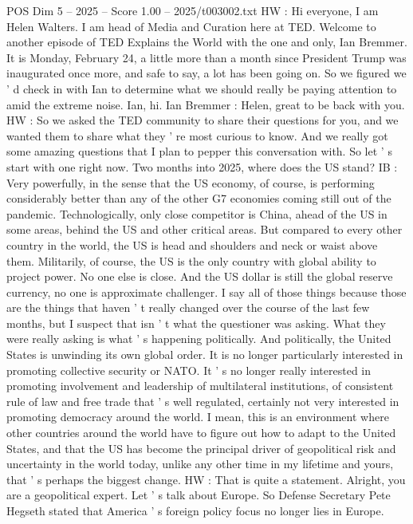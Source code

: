 \begin{textsample}{POS Dim 5 – 2025 – Score 1.00 – 2025/t003002.txt}  \label{ex:f5_pos_081}
HW : Hi everyone, I am Helen Walters.
I am head of Media and Curation here at TED.
Welcome to another episode of TED Explains the World with the one and only, Ian Bremmer.
It is Monday, February 24, a little more than a month since President Trump was inaugurated once more, and safe to say, a lot has been going on.
So we figured we ' d check in with Ian to determine what we should really be paying attention to amid the extreme noise.
Ian, hi.
Ian Bremmer : Helen, great to be back with you.
HW : So we asked the TED community to share their questions for you, and we wanted them to share what they ' re most curious to know.
And we really got some amazing questions that I plan to pepper this conversation with.
So let ' s start with one right now.
Two months into 2025, where does the US stand?
IB : Very powerfully, in the sense that the US economy, of course, is performing considerably better than any of the other G7 economies coming still out of the pandemic.
Technologically, only close competitor is China, ahead of the US in some areas, behind the US and other critical areas.
But compared to every other country in the world, the US is head and shoulders and neck or waist above them.
Militarily, of course, the US is the only country with global ability to project power.
No one else is close.
And the US dollar is still the global reserve currency, no one is approximate challenger.
I say all of those things because those are the things that haven ' t really changed over the course of the last few months, but I suspect that isn ' t what the questioner was asking.
What they were really asking is what ' s happening politically.
And politically, the United States is unwinding its own global order.
It is no longer particularly interested in promoting collective security or NATO.
It ' s no longer really interested in promoting involvement and leadership of multilateral institutions, of consistent rule of law and free trade that ' s well regulated, certainly not very interested in promoting democracy around the world.
I mean, this is an environment where other countries around the world have to figure out how to adapt to the United States, and that the US has become the principal driver of geopolitical risk and uncertainty in the world today, unlike any other time in my lifetime and yours, that ' s perhaps the biggest change.
HW : That is quite a statement.
Alright, you are a geopolitical expert.
Let ' s talk about Europe.
So Defense Secretary Pete Hegseth stated that America ' s foreign policy focus no longer lies in Europe.

\end{textsample}
